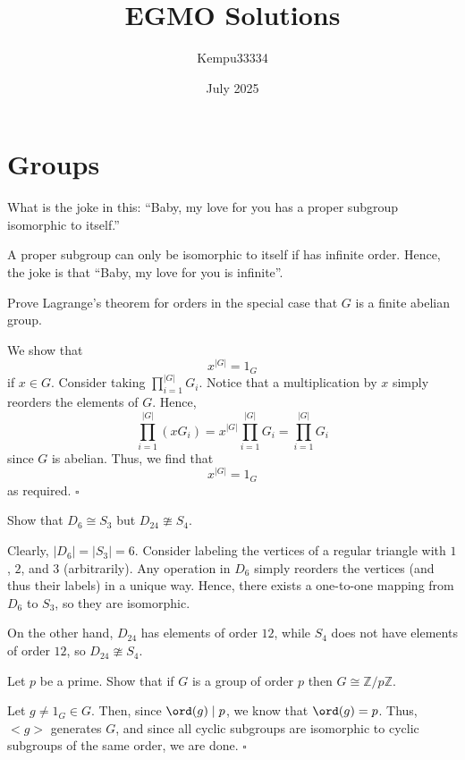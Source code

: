 \documentclass{article}
\title{EGMO Solutions}
\author{Kempu33334}
\date{July 2025}
\begin{document}
\maketitle

\tableofcontents

\newpage

\section{Groups}

\begin{problem}[1.A]
What is the joke in this: ``Baby, my love for you has a proper subgroup isomorphic to itself.''
\end{problem}
A proper subgroup can only be isomorphic to itself if has infinite order. Hence, the joke is that ``Baby, my love for you is infinite''.

\begin{problem}[1.B]
Prove Lagrange's theorem for orders in the special case that $G$ is a finite abelian group.
\end{problem}
We show that \[x^{|G|} = 1_G\] if $x \in G$. Consider taking $\prod_{i=1}^{|G|}G_i$. Notice that a multiplication by $x$ simply reorders the elements of $G$. Hence, \[\prod_{i=1}^{|G|}(xG_i) = x^{|G|}\prod_{i=1}^{|G|}G_i = \prod_{i=1}^{|G|}G_i\] since $G$ is abelian. Thus, we find that \[x^{|G|} = 1_G\] as required. $\square$

\begin{problem}[1.C]
Show that $D_6 \cong S_3$ but $D_{24} \ncong S_4$.
\end{problem}
Clearly, $|D_6| = |S_3| = 6$. Consider labeling the vertices of a regular triangle with $1$, $2$, and $3$ (arbitrarily). Any operation in $D_6$ simply reorders the vertices (and thus their labels) in a unique way. Hence, there exists a one-to-one mapping from $D_6$ to $S_3$, so they are isomorphic.

On the other hand, $D_{24}$ has elements of order $12$, while $S_4$ does not have elements of order $12$, so $D_{24} \ncong S_4$.

\begin{problem}[1.D]
Let $p$ be a prime. Show that if $G$ is a group of order $p$ then $G \cong \mathbb{Z}/p\mathbb{Z}$.
\end{problem}
Let $g \neq 1_G \in G$. Then, since $\ord(g) \mid p$, we know that $\ord(g) = p$. Thus, $<g>$ generates $G$, and since all cyclic subgroups are isomorphic to cyclic subgroups of the same order, we are done. $\square$
\end{document}
